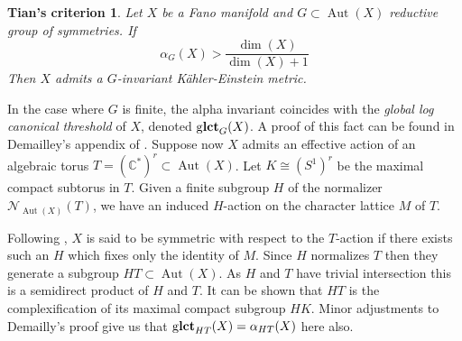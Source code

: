 \documentclass{amsart}
\newtheorem*{ttheorem}{Tian's criterion}
\theoremstyle{definition}
\newcommand{\CC}{\mathbb{C}}
\DeclareMathOperator{\Aut}{Aut}
\DeclareMathOperator{\glct}{g\bf{lct}}
\begin{document}
\begin{ttheorem}\label{thm:tcrit}
Let \(X\) be a Fano manifold and \(G \subset \Aut(X)\) reductive group of symmetries. If
\[
\alpha_{G} (X) > \frac{\dim(X)}{\dim(X) + 1}
\]
Then \(X\) admits a \(G\)-invariant K\"ahler-Einstein metric.
\end{ttheorem}
In the case where \(G\) is finite, the alpha invariant coincides with the \textit{global log canonical threshold} of \(X\), denoted \(\glct_G(X)\). A proof of this fact can be found in Demailley's appendix of \cite{cheltsov08}. 
%
%
%
%
%
%
Suppose now \(X\) admits an effective action of an algebraic torus \(T = (\CC^*)^{r} \subset \Aut(X)\). Let \(K \cong (S^1)^r\) be the maximal compact subtorus in \(T\). Given a finite subgroup \(H\) of the normalizer \(\mathcal{N}_{\Aut(X)}(T)\), we have an induced \(H\)-action on the character lattice \(M\) of \(T\).

Following \cite{batyrev99}, \(X\) is said to be symmetric with respect to the \(T\)-action if there exists such an \(H\) which fixes only the identity of \(M\). Since \(H\) normalizes \(T\) then they generate a subgroup \(H T \subset \Aut(X)\). As \(H\) and \(T\) have trivial intersection this is a semidirect product of \(H\) and \(T\). It can be shown that \(HT\) is the complexification of its maximal compact subgroup \(HK\). Minor adjustments to Demailly's proof give us that \( \glct_{HT}(X) = \alpha_{HT}(X) \) here also.
\end{document}
